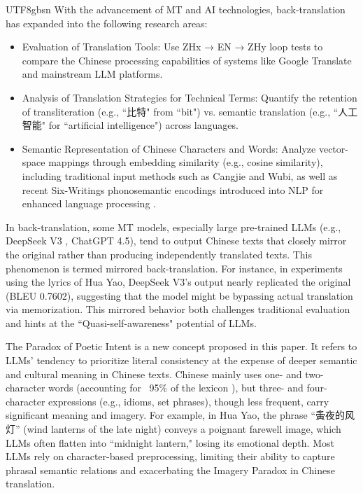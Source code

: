 \documentclass[conference]{IEEEtran}
\begin{document}
\begin{CJK}{UTF8}{gbsn}
With the advancement of MT and AI technologies, back-translation has expanded into the following research areas:
\begin{itemize}
    
\item Evaluation of Translation Tools: Use ZHx → EN → ZHy loop tests to compare the Chinese processing capabilities of systems like Google Translate and mainstream LLM platforms.

\item Analysis of Translation Strategies for Technical Terms: Quantify the retention of transliteration (e.g., ``比特" from ``bit") vs. semantic translation (e.g., ``人工智能" for ``artificial intelligence") across languages.

\item Semantic Representation of Chinese Characters and Words: Analyze vector-space mappings through embedding similarity (e.g., cosine similarity), including traditional input methods such as Cangjie and Wubi, as well as recent Six-Writings phonosemantic encodings introduced into NLP for enhanced language processing \citep{weigang2024six}.
 
\end{itemize}

In back-translation, some MT models, especially large pre-trained LLMs (e.g., DeepSeek V3 \citep{liu2024deepseek}, ChatGPT 4.5), tend to output Chinese texts that closely mirror the original rather than producing independently translated texts. This phenomenon is termed mirrored back-translation. For instance, in experiments using the lyrics of Hua Yao, DeepSeek V3's output nearly replicated the original (BLEU 0.7602), suggesting that the model might be bypassing actual translation via memorization. This mirrored behavior both challenges traditional evaluation and hints at the ``Quasi-self-awareness" potential of LLMs.

The Paradox of Poetic Intent is a new concept proposed in this paper. It refers to LLMs’ tendency to prioritize literal consistency at the expense of deeper semantic and cultural meaning in Chinese texts. Chinese mainly uses one- and two-character words (accounting for ~95\% of the lexicon \citep{liu1986chinese}), but three- and four-character expressions (e.g., idioms, set phrases), though less frequent, carry significant meaning and imagery. For example, in Hua Yao, the phrase ``夤夜的风灯'' (wind lanterns of the late night) conveys a poignant farewell image, which LLMs often flatten into ``midnight lantern," losing its emotional depth. Most LLMs rely on character-based preprocessing, limiting their ability to capture phrasal semantic relations and exacerbating the Imagery Paradox in Chinese translation.


\end{CJK}
\end{document}
